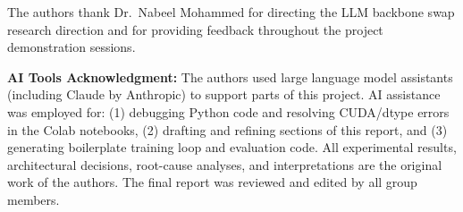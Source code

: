 \documentclass[conference]{IEEEtran}
\begin{document}
The authors thank Dr.\ Nabeel Mohammed  for directing the LLM backbone
swap research direction and for providing feedback throughout the project
demonstration sessions.

\textbf{AI Tools Acknowledgment:}
The authors used large language model assistants (including Claude by Anthropic)
to support parts of this project. AI assistance was employed for: (1) debugging
Python code and resolving CUDA/dtype errors in the Colab notebooks, (2) drafting
and refining sections of this report, and (3) generating boilerplate training
loop and evaluation code. All experimental results, architectural decisions,
root-cause analyses, and interpretations are the original work of the authors.
The final report was reviewed and edited by all group members.

\end{document}
